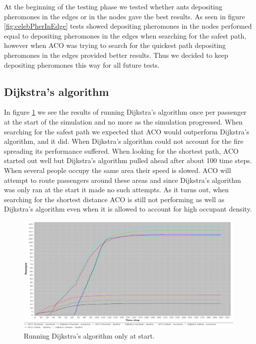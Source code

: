 At the beginning of the testing phase we tested whether ants depositing pheromones in the edges or in the nodes gave the best results.  As seen in figure \ref{fig:celebPherInEdge} tests showed depositing pheromones in the nodes performed equal to depositing pheromones in the edges when searching for the safest path, however when ACO was trying to search for the quickest path depositing pheromones in the edges provided better results. Thus we decided to keep depositing pheromones this way for all future tests.

\subsection{Dijkstra's algorithm}

In figure \ref{fig:celebDF} we see the results of running Dijkstra's algorithm once per passenger at the start of the simulation and no more as the simulation progressed. When searching for the safest path we expected that ACO would outperform Dijkstra's algorithm, and it did. When Dijkstra's algorithm could not account for the fire spreading its performance suffered. When looking for the shortest path, ACO started out well but Dijkstra's algorithm pulled ahead after about 100 time steps. When several people occupy the same area their speed is slowed. ACO will attempt to route passengers around these areas and since Dijkstra's algorithm was only ran at the start it made no such attempts. As it turns out, when searching for the shortest distance ACO is still not performing as well as Dijkstra's algorithm even when it is allowed to account for high occupant density.

\begin{figure} [h]
\centering
\hspace*{-1.0in}
\includegraphics[scale=0.35]{images/Graph-using-200-rounds-140-passangers-and-dijkstra-one-time.png}
\caption{Running Dijkstra's algorithm only at start.}
\label{fig:celebDF}
\end{figure}

